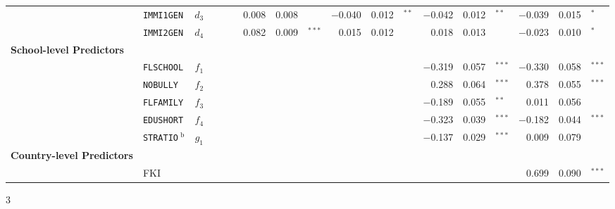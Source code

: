 {\begin{tabular}{l @{\hskip -3.5cm} l c rr @{\hskip -0.1mm}l rr @{\hskip -0.1mm}l rr @{\hskip -0.1mm}l rr @{\hskip -0.1mm}l rr @{\hskip -0.1mm}l}
            & \texttt{IMMI1GEN} & $d_3$ &       &       &       & 0.008 & 0.008 &       & $-$0.040 & 0.012 & $^{**}$ & $-$0.042 & 0.012 & $^{**}$ & $-$0.039 & 0.015 & $^*$ \\
            & \texttt{IMMI2GEN} & $d_4$ &       &       &       & 0.082 & 0.009 & $^{***}$ & 0.015 & 0.012 &       & 0.018 & 0.013 &       & $-$0.023 & 0.010 & $^*$ \\
      \textbf{School-level Predictors} &&       &       &       &       &       &       &       &       &       &       &       &       &       &       &       &  \\
            & \texttt{FLSCHOOL} & $f_1$ &       &       &       &       &       &       &       &       &       & $-$0.319 & 0.057 & $^{***}$ & $-$0.330 & 0.058 & $^{***}$ \\
            & \texttt{NOBULLY} & $f_2$ &       &       &       &       &       &       &       &       &       & 0.288 & 0.064 & $^{***}$ & 0.378 & 0.055 & $^{***}$ \\
            & \texttt{FLFAMILY} & $f_3$ &       &       &       &       &       &       &       &       &       & $-$0.189 & 0.055 & $^{**}$ & 0.011 & 0.056 &  \\
            & \texttt{EDUSHORT} & $f_4$ &       &       &       &       &       &       &       &       &       & $-$0.323 & 0.039 & $^{***}$ & $-$0.182 & 0.044 & $^{***}$ \\
            & \texttt{STRATIO}$\ ^\text{b}$ & $g_1$ &       &       &       &       &       &       &       &       &       & $-$0.137 & 0.029 & $^{***}$ & 0.009 & 0.079 &  \\
      \textbf{Country-level Predictors} &&       &       &       &       &       &       &       &       &       &       &       &       &       &       &       &  \\
            & FKI   &&       &       &       &       &       &       &       &       &       &       &       &       & 0.699 & 0.090 & $^{***}$ \\
      \end{tabular}
}{3}

